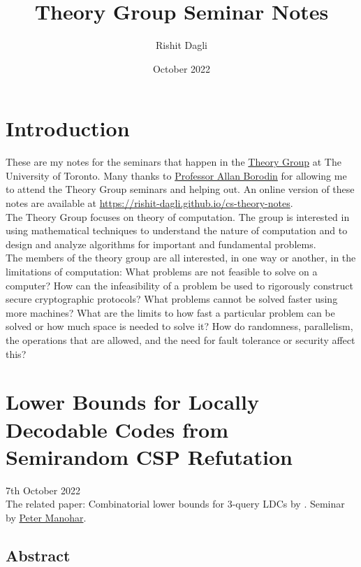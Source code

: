 \documentclass{article}
\title{Theory Group Seminar Notes}
\author{Rishit Dagli}
\date{October 2022}
\begin{document}
\maketitle

\tableofcontents
\clearpage

\section*{Introduction}

These are my notes for the seminars that happen in the \href{https://www.cs.toronto.edu/theory/}{Theory Group} at The University of Toronto. Many thanks to \href{http://www.cs.toronto.edu/~bor/}{Professor Allan Borodin} for allowing me to attend the Theory Group seminars and helping out. An online version of these notes are available at \url{https://rishit-dagli.github.io/cs-theory-notes}.\\

The Theory Group focuses on theory of computation. The group is interested in using mathematical techniques to understand the nature of computation and to design and analyze algorithms for important and fundamental problems.\\

The members of the theory group are all interested, in one way or another, in the limitations of computation: What problems are not feasible to solve on a computer? How can the infeasibility of a problem be used to rigorously construct secure cryptographic protocols? What problems cannot be solved faster using more machines? What are the limits to how fast a particular problem can be solved or how much space is needed to solve it? How do randomness, parallelism, the operations that are allowed, and the need for fault tolerance or security affect this?

\newpage

\section{Lower Bounds for Locally Decodable Codes from Semirandom CSP Refutation}

7th October 2022\\

The related paper: Combinatorial lower bounds for 3-query LDCs by \citet{https://doi.org/10.48550/arxiv.1911.10698}. Seminar by \href{https://www.cs.cmu.edu/~pmanohar/}{Peter Manohar}.

\subsection{Abstract}
\end{document}
